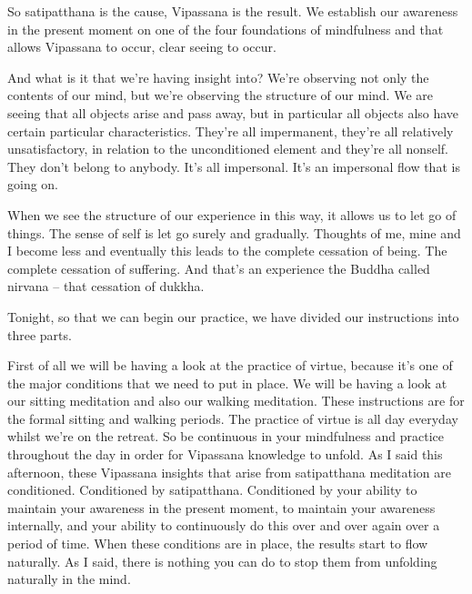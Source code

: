 \documentclass[letterpaper,10pt,english]{sphinxmanual}
\begin{document}
\sphinxAtStartPar
So satipatthana is the cause, Vipassana is the result. We establish our
awareness in the present moment on one of the four foundations of mindfulness and that allows Vipassana to occur, clear seeing to occur.

\sphinxAtStartPar
And what is it that we’re having insight into? We’re observing not only
the contents of our mind, but we’re observing the structure of our mind. We
are seeing that all objects arise and pass away, but in particular all objects
also have certain particular characteristics. They’re all impermanent, they’re
all  relatively  unsatisfactory,  in  relation  to  the  unconditioned  element  and
they’re all non\sphinxhyphen{}self. They don’t belong to anybody. It’s all impersonal. It’s an
impersonal flow that is going on.

\sphinxAtStartPar
When we see the structure of our experience in this way, it allows us to
let go of things. The sense of self is let go surely and gradually. Thoughts of
me, mine and I become less and eventually this leads to the complete cessation of being. The complete cessation of suffering. And that’s an experience
the Buddha called nirvana – that cessation of dukkha.

\sphinxAtStartPar
Tonight, so that we can begin our practice, we have divided our instructions into three parts.

\sphinxAtStartPar
First of all we will be having a look at the practice of virtue, because
  it’s  one  of  the  major  conditions  that  we  need  to  put  in  place.  We  will  be
having  a  look  at  our  sitting  meditation  and  also  our  walking  meditation.
These instructions are for the formal sitting and walking periods. The practice of virtue is all day everyday whilst we’re on the retreat. So be continuous in your mindfulness and practice throughout the day in order for Vipassana knowledge to unfold. As I said this afternoon, these Vipassana insights
that  arise  from  satipatthana  meditation  are  conditioned.  Conditioned  by
satipatthana. Conditioned by your ability to maintain your awareness in the
present moment, to maintain your awareness internally, and your ability to
continuously do this over and over again over a period of time. When these
conditions are in place, the results start to flow naturally. As I said, there is
nothing you can do to stop them from unfolding naturally in the mind.
\end{document}
